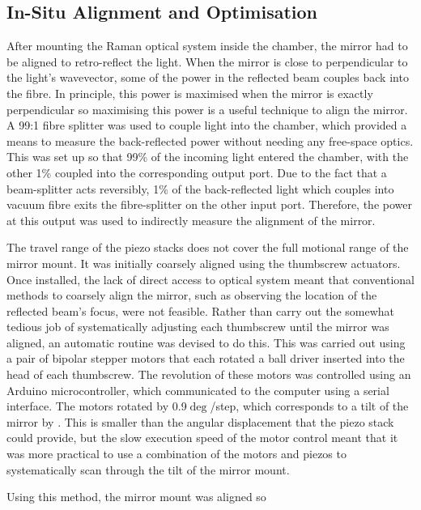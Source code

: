 \subsection{In-Situ Alignment and Optimisation}\label{sec:in_situ} 
After mounting the Raman optical system inside the chamber, the
mirror had to be aligned to retro-reflect the light. When the mirror is close to
perpendicular to the light's wavevector, some of the power in the reflected beam
couples back into the fibre. In principle, this power is maximised when the
mirror is exactly perpendicular so maximising this power is a useful technique
to align the mirror. A 99:1 fibre splitter was used to couple light into the
chamber, which provided a means to measure the back-reflected power without
needing any free-space optics. This was set up so that 99\% of the incoming
light entered the chamber, with the other 1\% coupled into the corresponding
output port. Due to the fact that a beam-splitter acts reversibly, 1\% of the
back-reflected light which couples into vacuum fibre exits the fibre-splitter on
the other input port. Therefore, the power at this output was used to indirectly
measure the alignment of the mirror.  
\par\noindent 
The travel range of the piezo stacks does not cover the full motional
range of the mirror mount. It was initially coarsely aligned using the
thumbscrew actuators.
Once
installed, the lack of direct access to optical system meant that conventional
methods to coarsely align the mirror, such as observing the location of the
reflected beam's focus, were not feasible. Rather than carry out the somewhat
tedious job of systematically adjusting each thumbscrew until the mirror was
aligned, an automatic routine was devised to do this. This was carried out using
a pair of bipolar stepper motors that each rotated a ball driver inserted into
the head of each thumbscrew. The revolution of these motors was controlled using
an Arduino microcontroller, which communicated to the computer using a serial
interface.  The motors rotated by 0.9\(\deg\)/step, which corresponds to a tilt
of the mirror by . This is smaller than the
 angular displacement that the piezo stack could
provide, but the slow execution speed of the motor control meant that it was
more practical to use a combination of the motors and piezos to systematically
scan through the tilt of the mirror mount.  %
\par\noindent 
Using this method, the mirror mount was aligned so
